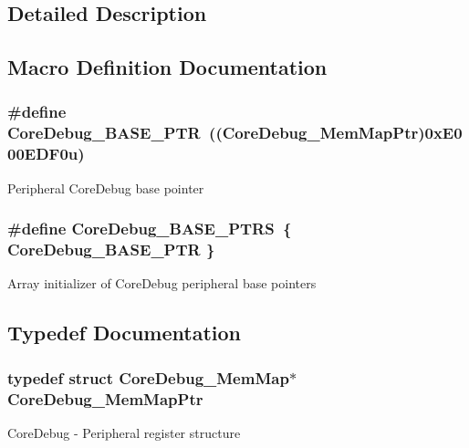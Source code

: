 \subsection{Detailed Description}


\subsection{Macro Definition Documentation}
\hypertarget{group___core_debug___peripheral_ga994a185afca30ede538d89322c4f0326}{}
\subsubsection[{Core\+Debug\+\_\+\+B\+A\+S\+E\+\_\+\+P\+T\+R}]{\setlength{\rightskip}{0pt plus 5cm}\#define Core\+Debug\+\_\+\+B\+A\+S\+E\+\_\+\+P\+T\+R~(({\bf Core\+Debug\+\_\+\+Mem\+Map\+Ptr})0x\+E000\+E\+D\+F0u)}\label{group___core_debug___peripheral_ga994a185afca30ede538d89322c4f0326}
Peripheral Core\+Debug base pointer \hypertarget{group___core_debug___peripheral_gaceec19d257d8b9f9bff5d47d285dec27}{}
\subsubsection[{Core\+Debug\+\_\+\+B\+A\+S\+E\+\_\+\+P\+T\+R\+S}]{\setlength{\rightskip}{0pt plus 5cm}\#define Core\+Debug\+\_\+\+B\+A\+S\+E\+\_\+\+P\+T\+R\+S~\{ {\bf Core\+Debug\+\_\+\+B\+A\+S\+E\+\_\+\+P\+T\+R} \}}\label{group___core_debug___peripheral_gaceec19d257d8b9f9bff5d47d285dec27}
Array initializer of Core\+Debug peripheral base pointers 

\subsection{Typedef Documentation}
\hypertarget{group___core_debug___peripheral_gaa548220bc91b12bd49065fe752579fcd}{}
\subsubsection[{Core\+Debug\+\_\+\+Mem\+Map\+Ptr}]{\setlength{\rightskip}{0pt plus 5cm}typedef struct {\bf Core\+Debug\+\_\+\+Mem\+Map}$\ast$ {\bf Core\+Debug\+\_\+\+Mem\+Map\+Ptr}}\label{group___core_debug___peripheral_gaa548220bc91b12bd49065fe752579fcd}
Core\+Debug -\/ Peripheral register structure 